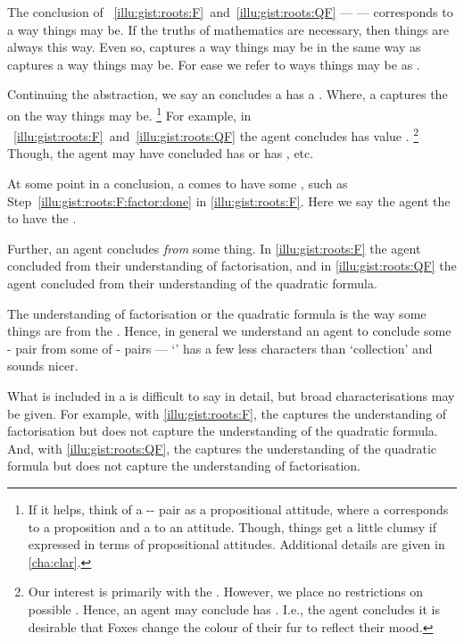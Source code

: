 \begin{note}
  The conclusion of ~\ref{illu:gist:roots:F}~and~\ref{illu:gist:roots:QF} --- \propM{\rootsCon{}} --- corresponds to a way things may be.
  If the truths of mathematics are necessary, then things are always this way.
  Even so, \propM{\rootsCon{}} captures a way things may be in the same way as  captures a way things may be.
  For ease we refer to ways things may be as \emph{}.

  Continuing the abstraction, we say an \agents{} concludes a  has a \emph{}.
  Where, a  captures the \agpe{} on the way things may be.%
  \footnote{
    If it helps, think of a -- pair as a propositional attitude, where a  corresponds to a proposition and a  to an attitude.
    Though, things get a little clumsy if expressed in terms of propositional attitudes.
    Additional details are given in \autoref{cha:clar}.
  }
  For example, in ~\ref{illu:gist:roots:F}~and~\ref{illu:gist:roots:QF} the agent concludes \propM{\rootsCon{}} has value .%
  \footnote{
    Our interest is primarily with the \val{} .
    However, we place no restrictions on possible .
    Hence, an agent may conclude  has \val{} .
    I.e., the agent concludes it is desirable that Foxes change the colour of their fur to reflect their mood.
  }
  Though, the agent may have concluded \propM{\rootsCon{}} has \val{}  or \propM{\rootsConBad{}} has \val{} , etc.

  At some point in a conclusion, a \prop{} comes to have some \val{}, such as Step~\ref{illu:gist:roots:F:factor:done} in \autoref{illu:gist:roots:F}.
  Here we say the agent \emph{\evals{}} the \prop{} to have the \val{}.
\end{note}


\begin{note}
  Further, an agent concludes \emph{from} some thing.
  In \autoref{illu:gist:roots:F} the agent concluded from their understanding of factorisation, and in \autoref{illu:gist:roots:QF} the agent concluded from their understanding of the quadratic formula.

  The \agents{} understanding of factorisation or the quadratic formula is the way some things are from the \agpe{}.
  Hence, in general we understand an agent to conclude some - pair from some \emph{\pool{}} of \prop{}-\val{} pairs --- `\pool{}' has a few less characters than `collection' and sounds nicer.

  What is included in a \pool{} is difficult to say in detail, but broad characterisations may be given.
  For example, with \autoref{illu:gist:roots:F}, the \pool{} captures the \agents{} understanding of factorisation but does not capture the \agents{} understanding of the quadratic formula.
  And, with \autoref{illu:gist:roots:QF}, the \pool{} captures the \agents{} understanding of the quadratic formula but does not capture the \agents{} understanding of factorisation.
\end{note}


